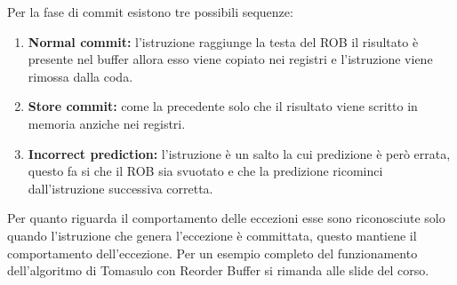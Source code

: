 Per la fase di commit esistono tre possibili sequenze: 
\begin{enumerate}
\item \textbf{Normal commit:} l'istruzione raggiunge la testa del ROB il risultato è presente nel buffer allora esso viene copiato nei registri e l'istruzione viene rimossa dalla coda.
\item \textbf{Store commit:} come la precedente solo che il risultato viene scritto in memoria anziche nei registri.
\item \textbf{Incorrect prediction:} l'istruzione è un salto la cui predizione è però errata, questo fa si che il ROB sia svuotato e che la predizione ricominci dall'istruzione successiva corretta.
\end{enumerate}
Per quanto riguarda il comportamento delle eccezioni esse sono riconosciute solo quando l'istruzione che genera l'eccezione è committata, questo mantiene il comportamento dell'eccezione.
Per un esempio completo del funzionamento dell'algoritmo di Tomasulo con Reorder Buffer si rimanda alle slide del corso.
